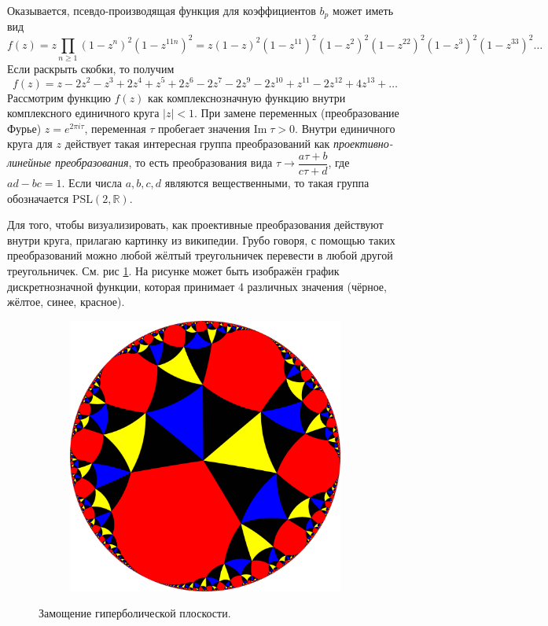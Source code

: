 \documentclass{article}
\theoremstyle{definition}
\newtheorem*{theorem}{Теорема}
\begin{document}
Оказывается, псевдо-производящая функция для коэффициентов \( b_p \) может иметь вид
\[
	f(z) = z\prod_{n \geq 1}(1 - z^{n})^2(1 - z^{11 n})^{2} = 
	z(1 - z)^2(1 - z^{11})^{2}(1 - z^2)^2(1 - z^{22})^{2}(1 - z^3)^2(1 - 
	z^{33})^{2} \ldots
\]
Если раскрыть скобки, то получим
\[
	f(z) = z - 2z^2 - z^3 + 2z^4 + z^5 + 2z^6 - 2z^7 - 2z^9 - 2z^{10} + z^{11} 
	- 
	2z^{12} + 4z^{13} + \ldots
\]
Рассмотрим функцию \( f(z) \) как комплекснозначную функцию внутри комплексного единичного круга \( {|z| < 1} \). При замене переменных (преобразование Фурье) \( z = e^{2 \pi i \tau} \), переменная \( \tau \) пробегает значения \( \mathrm{Im}\; \tau > 0 \). Внутри единичного круга для \( z \) действует такая интересная группа преобразований как \textit{проективно-линейные преобразования}, то есть преобразования вида \( \tau \to \dfrac{a \tau + b}{c\tau + d} \), где \( ad - bc = 1 \). Если числа \( a, b, c, d \) являются вещественными, то такая группа обозначается \( \mathrm{PSL}(2, \mathbb R) \).


Для того, чтобы визуализировать, как проективные преобразования действуют внутри круга, прилагаю картинку из википедии. Грубо говоря, с помощью таких преобразований можно любой жёлтый треугольничек перевести в любой другой треугольничек. См. рис \ref{fig:projective}. На рисунке может быть изображён график дискретнозначной функции, которая принимает 4 различных значения (чёрное, жёлтое, синее, красное).

\begin{figure}[h]
\centering
\begin{subfigure}{.8\textwidth}
	\centering
	\includegraphics[width=.5\textwidth]{projective.png}
\end{subfigure}%
\caption{Замощение гиперболической плоскости.}
\label{fig:projective}	
\end{figure}
\end{document}

